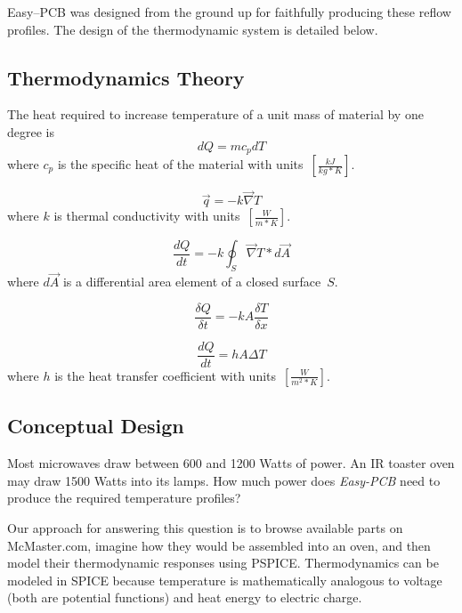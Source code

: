 \documentclass[10pt, twocolumn]{article}
\begin{document}
Easy--PCB was designed from the ground up for faithfully producing these
reflow profiles. The design of the thermodynamic system is detailed below.

\subsection{Thermodynamics Theory}

The heat required to increase temperature of a unit mass of material by one degree is
\begin{equation}
dQ=mc_{p}dT
\label{specific-heat-eq}
\end{equation}
where \(c_{p}\) is the specific heat of the material with \mbox{units \(\left[\frac{kJ}{kg*K}\right]\)}.

\begin{equation}
\vec{q}=-k\vec{\nabla}T
\label{fouriers-law-differential-form}
\end{equation}
where \(k\) is thermal conductivity with \mbox{units \(\left[\frac{W}{m*K}\right]\)}.

\begin{equation*}
\frac{dQ}{dt}=-k\oint _{S}\vec{\nabla}T*d\vec{A}
\end{equation*}
where \(d\vec{A}\) is a differential area element of a closed \mbox{surface \(S\)}.

\begin{equation}
\frac{\delta Q}{\delta t}=-kA\frac{\delta T}{\delta x}
\label{fouriers-law-in-1D}
\end{equation}

\begin{equation}
\frac{dQ}{dt}=hA\Delta T
\label{newtons-cooling-law}
\end{equation}
where \(h\) is the heat transfer coefficient with \mbox{units \(\left[\frac{W}{m^{2}*K}\right]\)}.

\subsection{Conceptual Design}

Most microwaves draw between 600 and 1200 Watts of power.
An IR toaster oven may draw 1500 Watts into its lamps.
How much power does \emph{Easy-PCB} need to produce the required temperature profiles?

Our approach for answering this question is to browse available parts on McMaster.com,
imagine how they would be assembled into an oven,
and then model their thermodynamic responses using PSPICE.
Thermodynamics can be modeled in SPICE because temperature is
mathematically analogous to voltage (both are potential functions)
and heat energy to electric charge.
\end{document}
